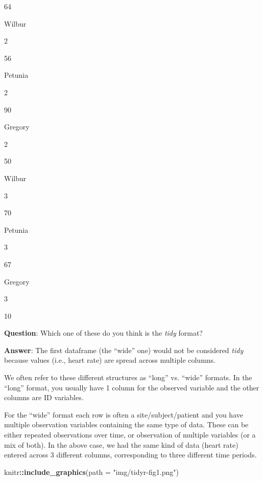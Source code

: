 \documentclass[]{book}
\newenvironment{Shaded}{\begin{snugshade}}{\end{snugshade}}
\newcommand{\KeywordTok}[1]{\textcolor[rgb]{0.13,0.29,0.53}{\textbf{#1}}}
\newcommand{\DataTypeTok}[1]{\textcolor[rgb]{0.13,0.29,0.53}{#1}}
\newcommand{\StringTok}[1]{\textcolor[rgb]{0.31,0.60,0.02}{#1}}
\newcommand{\OperatorTok}[1]{\textcolor[rgb]{0.81,0.36,0.00}{\textbf{#1}}}
\newcommand{\NormalTok}[1]{#1}
\begin{document}
64

Wilbur

2

56

Petunia

2

90

Gregory

2

50

Wilbur

3

70

Petunia

3

67

Gregory

3

10

\textbf{Question}: Which one of these do you think is the \emph{tidy}
format?

\textbf{Answer}: The first dataframe (the ``wide'' one) would not be
considered \emph{tidy} because values (i.e., heart rate) are spread
across multiple columns.

We often refer to these different structures as ``long'' vs. ``wide''
formats. In the ``long'' format, you usually have 1 column for the
observed variable and the other columns are ID variables.

For the ``wide'' format each row is often a site/subject/patient and you
have multiple observation variables containing the same type of data.
These can be either repeated observations over time, or observation of
multiple variables (or a mix of both). In the above case, we had the
same kind of data (heart rate) entered across 3 different columns,
corresponding to three different time periods.

\begin{Shaded}
\begin{Highlighting}[]
\NormalTok{knitr}\OperatorTok{::}\KeywordTok{include_graphics}\NormalTok{(}\DataTypeTok{path =} \StringTok{"img/tidyr-fig1.png"}\NormalTok{)}
\end{Highlighting}
\end{Shaded}
\end{document}
